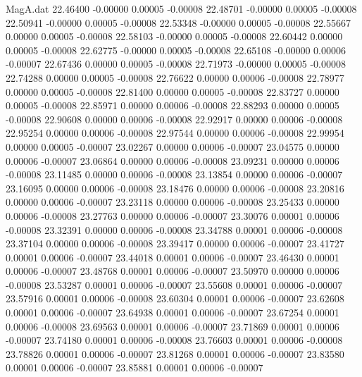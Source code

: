 \begin{filecontents}{MagA.dat}
  22.46400   -0.00000    0.00005   -0.00008
  22.48701   -0.00000    0.00005   -0.00008
  22.50941   -0.00000    0.00005   -0.00008
  22.53348   -0.00000    0.00005   -0.00008
  22.55667    0.00000    0.00005   -0.00008
  22.58103   -0.00000    0.00005   -0.00008
  22.60442    0.00000    0.00005   -0.00008
  22.62775   -0.00000    0.00005   -0.00008
  22.65108   -0.00000    0.00006   -0.00007
  22.67436    0.00000    0.00005   -0.00008
  22.71973   -0.00000    0.00005   -0.00008
  22.74288    0.00000    0.00005   -0.00008
  22.76622    0.00000    0.00006   -0.00008
  22.78977    0.00000    0.00005   -0.00008
  22.81400    0.00000    0.00005   -0.00008
  22.83727    0.00000    0.00005   -0.00008
  22.85971    0.00000    0.00006   -0.00008
  22.88293    0.00000    0.00005   -0.00008
  22.90608    0.00000    0.00006   -0.00008
  22.92917    0.00000    0.00006   -0.00008
  22.95254    0.00000    0.00006   -0.00008
  22.97544    0.00000    0.00006   -0.00008
  22.99954    0.00000    0.00005   -0.00007
  23.02267    0.00000    0.00006   -0.00007
  23.04575    0.00000    0.00006   -0.00007
  23.06864    0.00000    0.00006   -0.00008
  23.09231    0.00000    0.00006   -0.00008
  23.11485    0.00000    0.00006   -0.00008
  23.13854    0.00000    0.00006   -0.00007
  23.16095    0.00000    0.00006   -0.00008
  23.18476    0.00000    0.00006   -0.00008
  23.20816    0.00000    0.00006   -0.00007
  23.23118    0.00000    0.00006   -0.00008
  23.25433    0.00000    0.00006   -0.00008
  23.27763    0.00000    0.00006   -0.00007
  23.30076    0.00001    0.00006   -0.00008
  23.32391    0.00000    0.00006   -0.00008
  23.34788    0.00001    0.00006   -0.00008
  23.37104    0.00000    0.00006   -0.00008
  23.39417    0.00000    0.00006   -0.00007
  23.41727    0.00001    0.00006   -0.00007
  23.44018    0.00001    0.00006   -0.00007
  23.46430    0.00001    0.00006   -0.00007
  23.48768    0.00001    0.00006   -0.00007
  23.50970    0.00000    0.00006   -0.00008
  23.53287    0.00001    0.00006   -0.00007
  23.55608    0.00001    0.00006   -0.00007
  23.57916    0.00001    0.00006   -0.00008
  23.60304    0.00001    0.00006   -0.00007
  23.62608    0.00001    0.00006   -0.00007
  23.64938    0.00001    0.00006   -0.00007
  23.67254    0.00001    0.00006   -0.00008
  23.69563    0.00001    0.00006   -0.00007
  23.71869    0.00001    0.00006   -0.00007
  23.74180    0.00001    0.00006   -0.00008
  23.76603    0.00001    0.00006   -0.00008
  23.78826    0.00001    0.00006   -0.00007
  23.81268    0.00001    0.00006   -0.00007
  23.83580    0.00001    0.00006   -0.00007
  23.85881    0.00001    0.00006   -0.00007

\end{filecontents}
